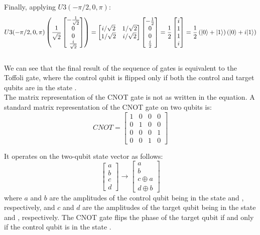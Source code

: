 \documentclass{article}
\begin{document}
	Finally, applying \( U3(-\pi/2, 0, \pi) \):
	\[       
	U3(-\pi/2, 0, \pi) 
	\left(
	\frac{1}{\sqrt{2}} 
	\begin{bmatrix} 
		-\frac{1}{\sqrt{2}} \\
		0 \\ 
		0 \\ 
		\frac{i}{\sqrt{2}} 
	\end{bmatrix}
	\right) 
	= 
	\begin{bmatrix} 
		i/\sqrt{2} 
		& 1/\sqrt{2} 
		\\ 
		1/\sqrt{2} 
		& i/\sqrt{2} 
	\end{bmatrix} 
	\begin{bmatrix} 
		-\frac{1}{2} \\
		0 \\
		0 \\ 
		\frac{i}{2} 
	\end{bmatrix} 
	= 
	\frac{1}{2} 
	\begin{bmatrix} 
		i \\ 
		1 \\ 
		1 \\
		i 
	\end{bmatrix} 
	= 
	\frac{1}{2} 
	\left(
	 |0\rangle  +  |1\rangle 
	\right) 
	\left(
	 |0\rangle  + i |1\rangle 
	\right)
	\] \\
	
	We can see that the final result of the sequence of gates is equivalent to the Toffoli gate, where the control qubit is flipped only if both the control and target qubits are in the state .  \\
	
	The matrix representation of the CNOT gate is not as written in the equation. A standard matrix representation of the CNOT gate on two qubits is: \\
	\[
	CNOT 
	= 
	\begin{bmatrix} 
		1 & 0 & 0 & 0 \\ 
		0 & 1 & 0 & 0 \\ 
		0 & 0 & 0 & 1 \\ 
		0 & 0 & 1 & 0 
	\end{bmatrix}
	\]
	
	It operates on the two-qubit state vector as follows:
	\[        
	\begin{bmatrix} 
		a \\ 
		b \\ 
		c \\ 
		d 
	\end{bmatrix} 
	\rightarrow 
	\begin{bmatrix} 
		a \\
		b \\ 
		c \oplus a \\ 
		d \oplus b 
	\end{bmatrix}
	\]
	where \( a \) and \( b \) are the amplitudes of the control qubit being in the state  and , respectively, and \( c \) and \( d \) are the amplitudes of the target qubit being in the state  and , respectively. 
	The CNOT gate flips the phase of the target qubit if and only if the control qubit is in the state .
	
\end{document}
